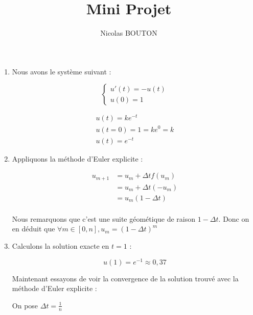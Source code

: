 \documentclass[12pt, letterpaper]{article}
\title{Mini Projet}
\author{Nicolas BOUTON}
\begin{document}
\maketitle

\begin{enumerate}

\item Nous avons le système suivant :

  \begin{equation*}
    \left\{
    \begin{array}{l}
      u'(t) = - u(t) \\
      u(0) = 1
    \end{array}
    \right.
  \end{equation*}

  \begin{equation*}
    \begin{array}{l}
      u(t) = ke^{-t} \\
      u(t = 0) = 1 = k e^0 = k \\
      u(t) = e^{-t}
    \end{array}
  \end{equation*}

\item Appliquons la méthode d'Euler explicite :

  \begin{equation*}
    \begin{split}
      u_{m + 1} & = u_m + \Delta t f(u_m) \\
      & = u_m + \Delta t (- u_m) \\
      & = u_m ( 1 - \Delta t ) \\
    \end{split}
  \end{equation*}

  Nous remarquons que c'est une suite géométique de raison $ 1 -
  \Delta t$. Donc on en déduit que $\forall m \in [0, n], u_m = ( 1 -
  \Delta t )^m$


\item
  Calculons la solution exacte en $t = 1$ :

  \begin{equation*}
    u(1) = e^{-1} \approx 0,37
  \end{equation*}

  Maintenant essayons de voir la convergence de la solution trouvé
  avec la méthode d'Euler explicite :

  On pose $\Delta t = \frac{1}{n}$


\end{enumerate}
\end{document}
